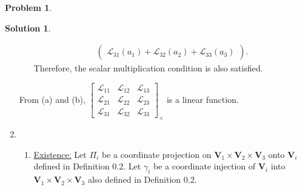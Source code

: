 \documentclass{article}
\theoremstyle{definition}
\newtheorem*{prob*}{Problem}
\newtheorem*{sln*}{Solution}
\newcommand{\V}{\mathbf{V}}
\newcommand{\lag}{\mathcal{L}}
\begin{document}
\begin{prob*}
\begin{sln*}
\begin{enumerate}
\begin{enumerate}
\begin{align*}
\begin{pmatrix}
			\lag_{31}(a_1) + \lag_{32}(a_2) + \lag_{33}(a_3)
			\end{pmatrix}.
			\end{align*}
			Therefore, the scalar multiplication condition is also satisfied.\\
			\end{enumerate}
			From (a) and (b), $
			\begin{bmatrix}
			\lag_{11} & \lag_{12} & \lag_{13}\\
			\lag_{21} & \lag_{22} & \lag_{23}\\
			\lag_{31} & \lag_{32} & \lag_{33}
			\end{bmatrix}_\times
			$
			is a linear function.\\
			
			
			
			
			
			
			
			
			
			
			
			
			
			
			
			
			
			\newpage
			\item
			\begin{enumerate}
			\item \underline{Existence:} Let $\Pi_i$ be a coordinate projection on $\V_1 \times \V_2 \times \V_3$ onto $\V_i$ defined in Definition 0.2. Let $\gamma_i$ be a coordinate injection of $\V_i$ into $\V_1 \times \V_2 \times \V_3$ also defined in Definition 0.2. \\
			

\end{enumerate}
\end{enumerate}
\end{sln*}
\end{prob*}
\end{document}
